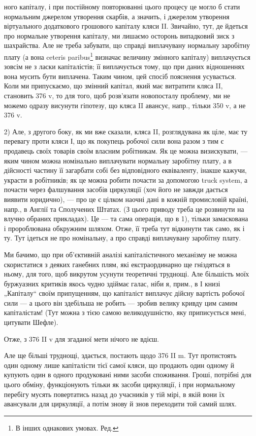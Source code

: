 ного капіталу, і при постійному повторюванні цього процесу це могло б
стати нормальним джерелом утворення скарбів, а значить, і джерелом
утворення віртуального додаткового грошового капіталу кляси II. Звичайно,
тут, де йдеться про нормальне утворення капіталу, ми лишаємо
осторонь випадковий зиск з шахрайства. Але не треба забувати, що
справді виплачувану нормальну заробітну плату (а вона ceteris paribus\footnote*{
В інших однакових умовах. Ред.
}
визначає величину змінного капіталу) виплачується зовсім не з ласки
капіталістів; її виплачується тому, що при даних відношеннях вона
мусить бути виплачена. Таким чином, цей спосіб пояснення усувається.
Коли ми припускаємо, що змінний капітал, який має витратити кляса II,
становить 376 v, то для того, щоб розв’язати новопосталу проблему, ми
не можемо одразу висунути гіпотезу, що кляса II авансує, напр., тільки
350 v, а не 376 v.

2) Але, з другого боку, як ми вже сказали, кляса II, розглядувана як
ціле, має ту перевагу проти кляси І, що як покупець робочої сили вона
разом з тим є продавець своїх товарів своїм власним робітникам. Як це
можна визискувати, — яким чином можна номінально виплачувати нормальну
заробітну плату, а в дійсності частину її загарбати собі без відповідного
еквіваленту, інакше кажучи, украсти в робітників; як це можна робити
почасти за допомогою truck system, а почасти через фалшування засобів
циркуляції (хоч його не завжди дається виявити юридично), — про
це є цілком наочні дані в кожній промисловій країні, напр., в Англії та
Сполучених Штатах. (З цього приводу треба це розвинути на влучно
обраних прикладах). Це — та сама операція, що в 1), тільки замаскована
і пророблювана обкружним шляхом. Отже, її треба тут відкинути так
само, як і ту. Тут ідеться не про номінальну, а про справді виплачувану
заробітну плату.

Ми бачимо, що при об’єктивній аналізі капіталістичного механізму не
можна скористатися з деяких ганебних плям, які екстраординарно ще
гніздяться в ньому, для того, щоб викрутом усунути теоретичні труднощі.
Але більшість моїх буржуазних критиків якось чудно здіймає галас, ніби
я, прим., в І книзі „Капіталу“ своїм припущенням, що капіталіст виплачує
дійсну вартість робочої сили — а цього він здебільша не робить —
зробив велику кривду цим самим капіталістам! (Тут можна з тією самою
великодушністю, яку приписується мені, цитувати Шефле).

Отже, з 376 II v для згаданої мети нічого не вдієш.

Але ще більші труднощі, здається, постають щодо 376 II m. Тут протистоять
один одному лише капіталісти тієї самої кляси, що продають
один одному й купують один в одного продуковані ними засоби споживання.
Гроші, потрібні для цього обміну, функціонують тільки як засоби
циркуляції, і при нормальному перебігу мусять повертатись назад
до учасників у тій мірі, в якій вони їх авансували для циркуляції, а потім
знову й знов переходити той самий шлях.